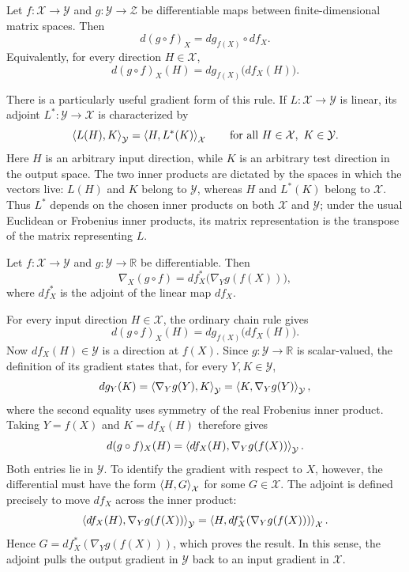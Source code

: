 \begin{theorem}
\label{thm:matrix-chain-rule}
Let $f:\mathcal{X}\to\mathcal{Y}$ and $g:\mathcal{Y}\to\mathcal{Z}$ be
differentiable maps between finite-dimensional matrix spaces. Then
\[
    d(g\circ f)_X
    =
    dg_{f(X)}\circ df_X.
\]
Equivalently, for every direction $H\in\mathcal{X}$,
\[
    d(g\circ f)_X(H)
    =
    dg_{f(X)}\bigl(df_X(H)\bigr).
\]
\end{theorem}

There is a particularly useful gradient form of this rule. If
$L:\mathcal{X}\to\mathcal{Y}$ is linear, its adjoint
$L^*:\mathcal{Y}\to\mathcal{X}$ is characterized by
\[
    \left\langle L(H), K \right\rangle_{\mathcal{Y}}
    =
    \left\langle H, L^*(K) \right\rangle_{\mathcal{X}}
    \qquad
    \text{for all }H\in\mathcal{X},\ K\in\mathcal{Y}.
\]
Here $H$ is an arbitrary input direction, while $K$ is an arbitrary test
direction in the output space.
The two inner products are dictated by the spaces in which the vectors live:
$L(H)$ and $K$ belong to $\mathcal{Y}$, whereas $H$ and $L^*(K)$ belong to
$\mathcal{X}$. Thus $L^*$ depends on the chosen inner products on both
$\mathcal{X}$ and $\mathcal{Y}$; under the usual Euclidean or Frobenius inner
products, its matrix representation is the transpose of the matrix representing
$L$.

\begin{theorem}
Let $f:\mathcal{X}\to\mathcal{Y}$ and $g:\mathcal{Y}\to\mathbb{R}$ be
differentiable. Then
\[
    \nabla_X(g\circ f)
    =
    df_X^*\bigl(\nabla_Y g(f(X))\bigr),
\]
where $df_X^*$ is the adjoint of the linear map $df_X$.
\end{theorem}

\begin{pfbox}
For every input direction $H\in\mathcal{X}$, the ordinary chain rule gives
\[
    d(g\circ f)_X(H)
    =
    dg_{f(X)}\bigl(df_X(H)\bigr).
\]
Now $df_X(H)\in\mathcal{Y}$ is a direction at $f(X)$. Since
$g:\mathcal{Y}\to\mathbb{R}$ is scalar-valued, the definition of its gradient
states that, for every $Y,K\in\mathcal{Y}$,
\[
    dg_Y(K)
    =\left\langle \nabla_Yg(Y), K \right\rangle_{\mathcal{Y}}
    =\left\langle K, \nabla_Yg(Y) \right\rangle_{\mathcal{Y}},
\]
where the second equality uses symmetry of the real Frobenius inner product.
Taking $Y=f(X)$ and $K=df_X(H)$ therefore gives
\[
    d(g\circ f)_X(H)
    =
    \left\langle df_X(H), \nabla_Yg(f(X)) \right\rangle_{\mathcal{Y}}.
\]
Both entries lie in $\mathcal{Y}$. To identify the gradient with respect to
$X$, however, the differential must have the form
$\left\langle H, G \right\rangle_{\mathcal{X}}$ for some $G\in\mathcal{X}$. The adjoint is
defined precisely to move $df_X$ across the inner product:
\[
    \left\langle df_X(H), \nabla_Y g(f(X)) \right\rangle_{\mathcal{Y}}
    =
    \left\langle H, df_X^*(\nabla_Y g(f(X))) \right\rangle_{\mathcal{X}}.
\]
Hence $G=df_X^*(\nabla_Y g(f(X)))$, which proves the result. In this sense, the
adjoint pulls the output gradient in $\mathcal{Y}$ back to an input gradient in
$\mathcal{X}$.
\end{pfbox}

